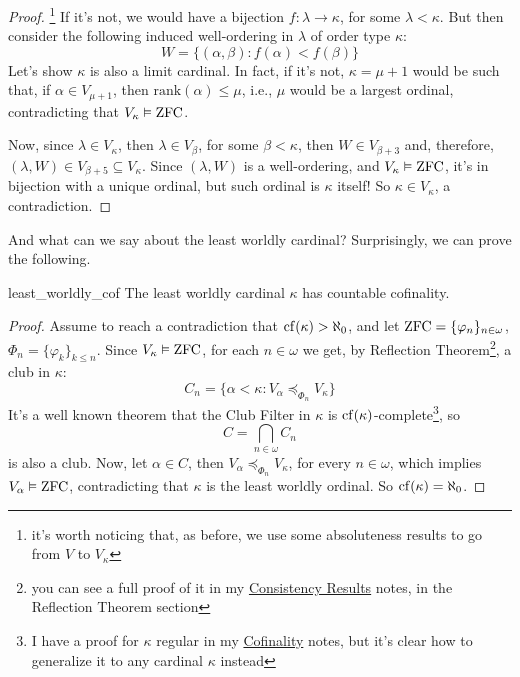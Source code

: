 \begin{proof}\footnote{it's worth noticing that, as before, we use some absoluteness results to go from $V$ to $V_\kappa$}
    If it's not, we would have a bijection $f:\lambda\to\kappa$, for some $\lambda<\kappa$. But then consider the following induced well-ordering in $\lambda$ of order type $\kappa$:
    $$W=\{(\alpha,\beta):f(\alpha)<f(\beta)\}$$
    Let's show $\kappa$ is also a limit cardinal. In fact, if it's not, $\kappa=\mu+1$ would be such that, if $\alpha\in V_{\mu+1}$, then $\mathrm{rank}(\alpha)\leq\mu$, i.e., $\mu$ would be a largest ordinal, contradicting that $V_\kappa\vDash\mathrm{ZFC}$.

    Now, since $\lambda\in V_\kappa$, then $\lambda\in V_\beta$, for some $\beta<\kappa$, then $W\in V_{\beta+3}$ and, therefore, $(\lambda,W)\in V_{\beta+5}\subseteq V_\kappa$. Since $(\lambda,W)$ is a well-ordering, and $V_\kappa\vDash\mathrm{ZFC}$, it's in bijection with a unique ordinal, but such ordinal is $\kappa$ itself! So $\kappa\in V_\kappa$, a contradiction.
\end{proof}

And what can we say about the least worldly cardinal? Surprisingly, we can prove the following.

\begin{lemma}{}{least_worldly_cof}
    The least worldly cardinal $\kappa$ has countable cofinality.
\end{lemma}

\begin{proof}
    Assume to reach a contradiction that $\mathrm{cf}\!\left(\kappa\right)>\aleph_0$, and let $\mathrm{ZFC}=\{\varphi_n\}_{n\in\omega}$, $\Phi_n=\{\varphi_k\}_{k\leq n}$. Since $V_\kappa\vDash\mathrm{ZFC}$, for each $n\in\omega$ we get, by Reflection Theorem\footnote{you can see a full proof of it in my \href{https://github.com/Xennonio/Consistency-Results}{Consistency Results} notes, in the Reflection Theorem section}, a club in $\kappa$:
    $$C_n=\{\alpha<\kappa:V_\alpha\preceq_{\Phi_n} V_\kappa\}$$
    It's a well known theorem that the Club Filter in $\kappa$ is $\mathrm{cf}\!\left(\kappa\right)$-complete\footnote{I have a proof for $\kappa$ regular in my \href{https://github.com/Xennonio/Cofinality}{Cofinality} notes, but it's clear how to generalize it to any cardinal $\kappa$ instead}, so
    $$C=\bigcap_{n\in\omega}C_n$$
    is also a club. Now, let $\alpha\in C$, then $V_\alpha\preceq_{\Phi_n}V_\kappa$, for every $n\in\omega$, which implies $V_\alpha\vDash\mathrm{ZFC}$, contradicting that $\kappa$ is the least worldly ordinal. So $\mathrm{cf}\!\left(\kappa\right)=\aleph_0$.
\end{proof}

